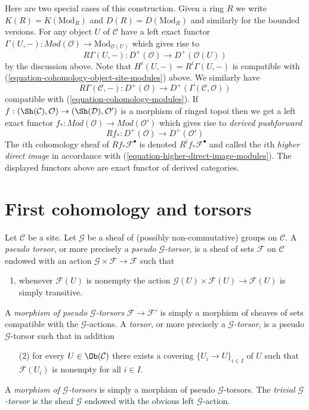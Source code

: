 \medskip\noindent
Here are two special cases of this construction. Given a ring $R$ we write
$K(R) = K(\text{Mod}_R)$ and $D(R) = D(\text{Mod}_R)$ and similarly for the
bounded versions. For any object $U$ of $\mathcal{C}$ have a left exact functor
$
\Gamma(U, -) :
\textit{Mod}(\mathcal{O})
\longrightarrow
\text{Mod}_{\mathcal{O}(U)}
$
which gives rise to
$$
R\Gamma(U, -) :
D^{+}(\mathcal{O})
\longrightarrow
D^{+}(\mathcal{O}(U))
$$
by the discussion above. Note that $H^i(U, -) = R^i\Gamma(U, -)$
is compatible with (\ref{equation-cohomology-object-site-modules}) above.
We similarly have
$$
R\Gamma(\mathcal{C}, -) :
D^{+}(\mathcal{O})
\longrightarrow
D^{+}(\Gamma(\mathcal{C}, \mathcal{O}))
$$
compatible with (\ref{equation-cohomology-modules}). If
$f : (\Sh(\mathcal{C}), \mathcal{O}) \to (\Sh(\mathcal{D}), \mathcal{O}')$
is a morphism of ringed topoi then we get a left exact functor
$f_* : \textit{Mod}(\mathcal{O}) \to \textit{Mod}(\mathcal{O}')$
which gives rise to {\it derived pushforward}
$$
Rf_* : D^{+}(\mathcal{O}) \to D^+(\mathcal{O}')
$$
The $i$th cohomology sheaf of $Rf_*\mathcal{F}^\bullet$ is denoted
$R^if_*\mathcal{F}^\bullet$ and called the $i$th {\it higher direct image}
in accordance with (\ref{equation-higher-direct-image-modules}).
The displayed functors above are exact functor
of derived categories.







\section{First cohomology and torsors}
\label{section-h1-torsors}

\begin{definition}
\label{definition-torsor}
Let $\mathcal{C}$ be a site.
Let $\mathcal{G}$ be a sheaf of (possibly non-commutative)
groups on $\mathcal{C}$.
A {\it pseudo torsor}, or more precisely a
{\it pseudo $\mathcal{G}$-torsor}, is a sheaf
of sets $\mathcal{F}$ on $\mathcal{C}$ endowed with an action
$\mathcal{G} \times \mathcal{F} \to \mathcal{F}$ such that
\begin{enumerate}
\item whenever $\mathcal{F}(U)$ is nonempty the action
$\mathcal{G}(U) \times \mathcal{F}(U) \to \mathcal{F}(U)$
is simply transitive.
\end{enumerate}
A {\it morphism of pseudo $\mathcal{G}$-torsors}
$\mathcal{F} \to \mathcal{F}'$
is simply a morphism of sheaves of sets compatible with the
$\mathcal{G}$-actions.
A {\it torsor}, or more precisely a
{\it $\mathcal{G}$-torsor}, is a pseudo $\mathcal{G}$-torsor such that
in addition
\begin{enumerate}
\item[(2)] for every $U \in \Ob(\mathcal{C})$
there exists a covering $\{U_i \to U\}_{i \in I}$ of $U$
such that $\mathcal{F}(U_i)$ is nonempty for all $i \in I$.
\end{enumerate}
A {\it morphism of $\mathcal{G}$-torsors} is simply a morphism of
pseudo $\mathcal{G}$-torsors.
The {\it trivial $\mathcal{G}$-torsor}
is the sheaf $\mathcal{G}$ endowed with the obvious left
$\mathcal{G}$-action.
\end{definition}

